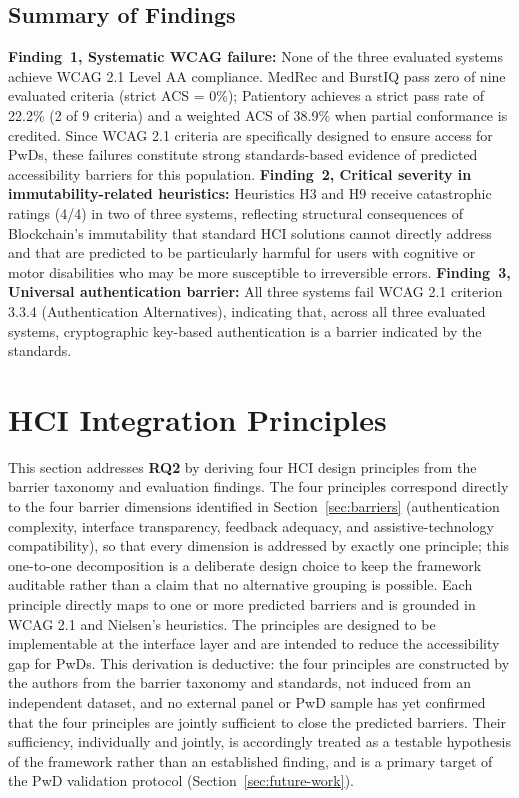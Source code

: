 \documentclass[journal,onecolumn]{IEEEtran}
\begin{document}
\subsection{Summary of Findings}
\label{sec:gap-analysis} \textbf{Finding~1, Systematic WCAG failure:} None of the three evaluated systems achieve WCAG 2.1 Level AA compliance. MedRec and BurstIQ pass zero of nine evaluated criteria (strict ACS = 0\%); Patientory achieves a strict pass rate of 22.2\% (2 of 9 criteria) and a weighted ACS of 38.9\% when partial conformance is credited. Since WCAG 2.1 criteria are specifically designed to ensure access for PwDs, these failures constitute strong standards-based evidence of predicted accessibility barriers for this population. \textbf{Finding~2, Critical severity in immutability-related heuristics:} Heuristics H3 and H9 receive catastrophic ratings (4/4) in two of three systems, reflecting structural consequences of Blockchain's immutability that standard HCI solutions cannot directly address and that are predicted to be particularly harmful for users with cognitive or motor disabilities who may be more susceptible to irreversible errors. \textbf{Finding~3, Universal authentication barrier:} All three systems fail WCAG 2.1 criterion 3.3.4 (Authentication Alternatives), indicating that, across all three evaluated systems, cryptographic key-based authentication is a barrier indicated by the standards.


\section{HCI Integration Principles}
\label{sec:principles}

This section addresses \textbf{RQ2} by deriving four HCI design principles from the barrier taxonomy and evaluation findings. The four principles correspond directly to the four barrier dimensions identified in Section~\ref{sec:barriers} (authentication complexity, interface transparency, feedback adequacy, and assistive-technology compatibility), so that every dimension is addressed by exactly one principle; this one-to-one decomposition is a deliberate design choice to keep the framework auditable rather than a claim that no alternative grouping is possible. Each principle directly maps to one or more predicted barriers and is grounded in WCAG 2.1 and Nielsen's heuristics. The principles are designed to be implementable at the interface layer and are intended to reduce the accessibility gap for PwDs. This derivation is deductive: the four principles are constructed by the authors from the barrier taxonomy and standards, not induced from an independent dataset, and no external panel or PwD sample has yet confirmed that the four principles are jointly sufficient to close the predicted barriers. Their sufficiency, individually and jointly, is accordingly treated as a testable hypothesis of the framework rather than an established finding, and is a primary target of the PwD validation protocol (Section~\ref{sec:future-work}).
\end{document}
